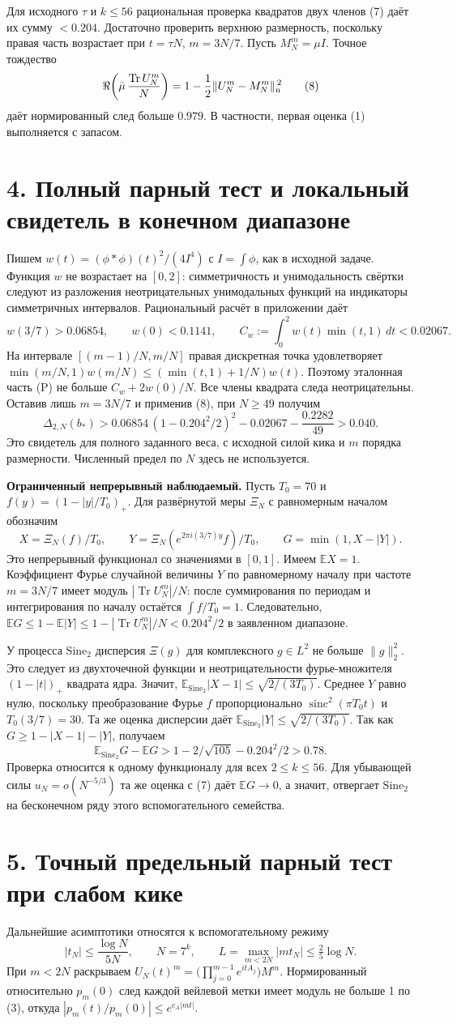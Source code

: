 \documentclass[11pt,a4paper]{article}
\newcommand{\Tr}{\operatorname{Tr}}
\newcommand{\EE}{\mathbb E}
\newcommand{\si}{\mathrm{Sine}_2}
\newcommand{\sinc}{\operatorname{sinc}}
\newcommand{\sect}[1]{\section*{\sffamily\color{ink}#1}}
\newcommand{\subt}[1]{\par\medskip\noindent\textbf{#1.}\quad}
\begin{document}
Для исходного $\tau$ и $k\le56$ рациональная проверка квадратов двух членов (7) даёт их сумму $<0.204$. Достаточно проверить верхнюю размерность, поскольку правая часть возрастает при $t=\tau N$, $m=3N/7$. Пусть $M_N^m=\mu I$. Точное тождество
\[
 \Re\!\left(\bar\mu\,\frac{\Tr U_N^m}{N}\right)
             =1-\frac12\|U_N^m-M_N^m\|_{\rm n}^{\,2}                \tag{8}
\]
даёт нормированный след больше $0.979$. В частности, первая оценка (1) выполняется с запасом.
\newpage
\sect{4. Полный парный тест и локальный свидетель в конечном диапазоне}
Пишем $w(t)=(\phi*\phi)(t)^2/(4I^4)$ с $I=\int\phi$, как в исходной задаче. Функция $w$ не возрастает на $[0,2]$: симметричность и унимодальность свёртки следуют из разложения неотрицательных унимодальных функций на индикаторы симметричных интервалов. Рациональный расчёт в приложении даёт
\[
 w(3/7)>0.06854,\qquad w(0)<0.1141,\qquad
 C_w:=\int_0^2 w(t)\min(t,1)\,dt<0.02067.
\]
На интервале $[(m-1)/N,m/N]$ правая дискретная точка удовлетворяет $\min(m/N,1)w(m/N)\le(\min(t,1)+1/N)w(t)$. Поэтому эталонная часть (P) не больше $C_w+2w(0)/N$. Все члены квадрата следа неотрицательны. Оставив лишь $m=3N/7$ и применив (8), при $N\ge49$ получим
\[
 \Delta_{2,N}(b_*)>
         0.06854\,(1-0.204^2/2)^2-0.02067-\frac{0.2282}{49}>0.040.
\]
Это свидетель для полного заданного веса, с исходной силой кика и $m$ порядка размерности. Численный предел по $N$ здесь не используется.

\subt{Ограниченный непрерывный наблюдаемый} Пусть $T_0=70$ и $f(y)=(1-|y|/T_0)_+$. Для развёрнутой меры $\Xi_N$ с равномерным началом обозначим
\[
 X=\Xi_N(f)/T_0,\qquad Y=\Xi_N(e^{2\pi i (3/7)y}f)/T_0,\qquad
 G=\min(1,X-|Y|).
\]
Это непрерывный функционал со значениями в $[0,1]$. Имеем $\EE X=1$. Коэффициент Фурье случайной величины $Y$ по равномерному началу при частоте $m=3N/7$ имеет модуль $|\Tr U_N^m|/N$: после суммирования по периодам и интегрирования по началу остаётся $\int f/T_0=1$. Следовательно, $\EE G\le1-\EE|Y|\le1-|\Tr U_N^m|/N<0.204^2/2$ в заявленном диапазоне.

У процесса $\si$ дисперсия $\Xi(g)$ для комплексного $g\in L^2$ не больше $\|g\|_2^2$. Это следует из двухточечной функции и неотрицательности фурье-множителя $(1-|t|)_+$ квадрата ядра. Значит, $\EE_{\si}|X-1|\le\sqrt{2/(3T_0)}$. Среднее $Y$ равно нулю, поскольку преобразование Фурье $f$ пропорционально $\sinc^2(\pi T_0 t)$ и $T_0(3/7)=30$. Та же оценка дисперсии даёт $\EE_{\si}|Y|\le\sqrt{2/(3T_0)}$. Так как $G\ge1-|X-1|-|Y|$, получаем
\[
             \EE_{\si}G-\EE G
                  >1-2/\sqrt{105}-0.204^2/2>0.78 .
\]
Проверка относится к одному функционалу для всех $2\le k\le56$. Для убывающей силы $u_N=o(N^{-5/3})$ та же оценка с (7) даёт $\EE G\to0$, а значит, отвергает $\si$ на бесконечном ряду этого вспомогательного семейства.
\newpage
\sect{5. Точный предельный парный тест при слабом кике}
Дальнейшие асимптотики относятся к вспомогательному режиму
\[
          |t_N|\le\frac{\log N}{5N},\qquad N=7^k,\qquad
          L=\max_{m<2N}|m t_N|\le\tfrac25\log N.                    \tag{9}
\]
При $m<2N$ раскрываем $U_N(t)^m=\bigl(\prod_{j=0}^{m-1} e^{it A_j}\bigr) M^m$. Нормированный относительно $p_m(0)$ след каждой вейлевой метки имеет модуль не больше 1 по (3), откуда $|p_m(t)/p_m(0)|\le e^{c_A |mt|}$.
\end{document}
